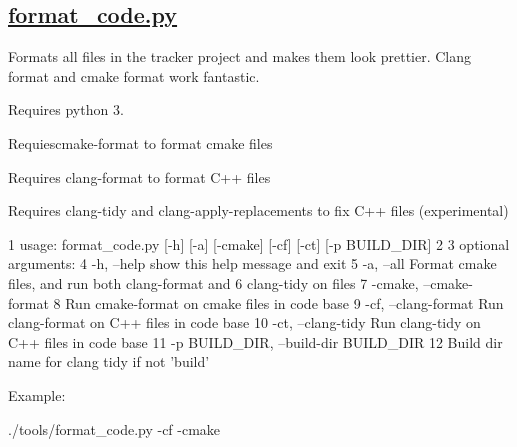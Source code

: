\subsection*{\hyperlink{format__code_8py}{format\+\_\+code.\+py}}

Formats all files in the tracker project and makes them look prettier. Clang format and cmake format work fantastic.

Requires python 3.
\begin{DoxyEnumerate}
\item Requies{\ttfamily cmake-\/format} to format cmake files
\item Requires {\ttfamily clang-\/format} to format C++ files
\item Requires {\ttfamily clang-\/tidy} and {\ttfamily clang-\/apply-\/replacements} to fix C++ files (experimental)
\end{DoxyEnumerate}


\begin{DoxyCode}
1 usage: format\_code.py [-h] [-a] [-cmake] [-cf] [-ct] [-p BUILD\_DIR]
2 
3 optional arguments:
4   -h, --help            show this help message and exit
5   -a, --all             Format cmake files, and run both clang-format and
6                         clang-tidy on files
7   -cmake, --cmake-format
8                         Run cmake-format on cmake files in code base
9   -cf, --clang-format   Run clang-format on C++ files in code base
10   -ct, --clang-tidy     Run clang-tidy on C++ files in code base
11   -p BUILD\_DIR, --build-dir BUILD\_DIR
12                         Build dir name for clang tidy if not 'build'
\end{DoxyCode}
 Example\+:

{\ttfamily ./tools/format\+\_\+code.py -\/cf -\/cmake} 